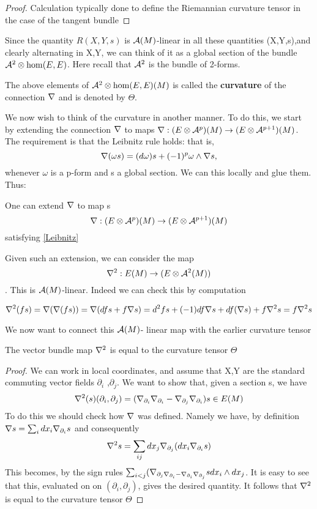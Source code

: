 \begin{proof}
 Calculation typically done to define the Riemannian curvature tensor in the case of the tangent bundle
\end{proof}
Since the quantity $R(X,Y,s)$ is $\mathcal{A}(M)$-linear in all these quantities (X,Y,s),and clearly alternating in X,Y, we 
can think of it as a global section of the bundle $\mathcal{A}^{2}\otimes \hom(E,E)$. Here recall that $\mathcal{A}^{2}$ is the
bundle of 2-forms.
\begin{definition}
 The above elements of $\mathcal{A}^{2}\otimes \hom(E,E)(M)$ is called the \textbf{curvature} of the connection $\nabla$ and is 
denoted by $\Theta$.
\end{definition}

We now wish to think of the curvature in another manner. To do this, we start by extending the connection $\nabla$ to maps 
$\nabla:(E \otimes \mathcal{A}^p)(M)\to (E\otimes \mathcal{A}^{p+1})(M)$. The requirement is that the Leibnitz rule holds: that is,
\begin{equation}\label{Leibnitz}
\nabla (\omega s) = (d \omega)s + (-1)^p \omega \wedge \nabla s,
\end{equation}
whenever $\omega$ is a p-form and s a global section. We can this locally and glue them.
Thus: 
\begin{proposition}
 One can extend $\nabla$ to map s 
$$\nabla: (E \otimes \mathcal{A}^p)(M)\to (E\otimes \mathcal{A}^{p+1})(M) $$ satisfying \ref{Leibnitz}
\end{proposition}
Given such an extension, we can consider the map
$$\nabla^2:E(M) \to (E \otimes \mathcal{A}^2(M)) $$.
This is $\mathcal{A}(M)$-linear. Indeed we can check this by computation
\begin{example}
 $$\nabla^2(fs) = \nabla(\nabla(fs))
\\ = \nabla(dfs + f\nabla s)
\\ = d^2 fs +(-1)df \nabla s + df(\nabla s) +f \nabla^{2} s
\\ = f\nabla^2 s$$
\end{example}
We now want to connect this $\mathcal{A}(M)$- linear map with the earlier curvature tensor
\begin{proposition}
 The vector bundle map $\nabla^2$ is equal to the curvature tensor $\Theta$
\end{proposition}
\begin{proof}
 We can work in local coordinates, and assume that X,Y are the standard commuting vector fields $\partial_i$ ,$\partial_j$.
We want to show that, given a section s, we have 
\\$$\nabla^2(s)(\partial_i , \partial_j) = (\nabla_{\partial_i} \nabla_{\partial_i} - \nabla_{\partial_j}\nabla_{\partial_i})s 
\in E(M)$$
To do this we should check how $\nabla$ was defined. Namely we have, by definition 
$\nabla s = \sum_i dx_i \nabla_{\partial_i} s$
and consequently 
$$\nabla^2 s = \sum_{ij} dx_j \nabla_{\partial_j}(dx_i \nabla_{\partial_i}s)$$
This becomes, by the sign rules 
$\sum_{i< j}(\nabla_{\partial_j \nabla_{\partial_i} -  \nabla_{\partial_i} \nabla_{\partial_j}}s dx_i \wedge dx_j$.
It is easy to see that this, evaluated on on $(\partial_i,\partial_j)$, gives the desired quantity.
It follows that $\nabla^2$ is equal to the curvature tensor $\Theta$
\end{proof}
